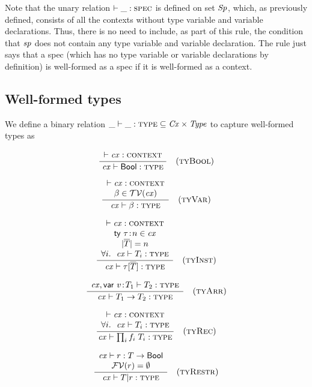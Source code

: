 Note that the unary relation $\spwfY$ is defined on set $\Spec$, which, as
previously defined, consists of all the contexts without type variable and
variable declarations. Thus, there is no need to include, as part of this
rule, the condition that $\spec$ does not contain any type variable and
variable declaration. The rule just says that a spec (which has no type
variable or variable declarations by definition) is well-formed as a spec if
it is well-formed as a context.

\subsection{Well-formed types}

We define a binary relation $\binrel{\istyY}{\Cx}{\Typ}$ to capture
well-formed types as

\[
\rruleI
 {\cxwfO}
 {\istyO{\bool}}
 {\Rtbool}
\]

\[
\rruleII
 {\cxwfO}
 {\tvar\in\cxtvarO}
 {\istyO{\tvar}}
 {\Rtvar}
\]

\[
\rruleIV
 {\cxwfO}
 {\tdecO\in\cx}
 {\seqlen{\typS}=n}
 {\FORALL{i}{\istyO{\typ_i}}}
 {\istyO{\tinstO}}
 {\Rtinst}
\]

\[
\rruleI
 {\isty{\snoc{\cx}{\vdec{\var}{\typ_1}}}{\typ_2}}
 {\istyO{\tarrO}}
 {\Rtarr}
\]

\[
\rruleII
 {\cxwfO}
 {\FORALL{i}{\istyO{\typ_i}}}
 {\istyO{\trecO}}
 {\Rtrec}
\]

\[
\rruleII
 {\hastyO{\tspred}{\tarr{\typ}{\bool}}}
 {\efvar{\tspred}=\emptyset}
 {\istyO{\tsubO}}
 {\Rtsub}
\]

